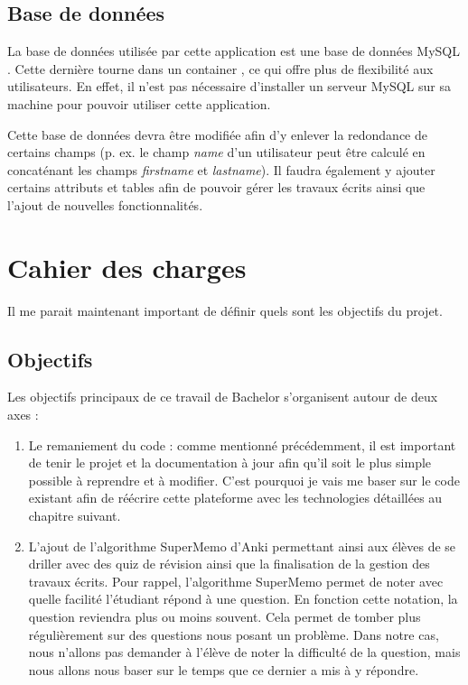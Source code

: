 \subsection{Base de données}
La base de données utilisée par cette application est une base de données MySQL \cite{MySQL}. Cette dernière tourne dans un container  \cite{Docker}, ce qui offre plus de flexibilité aux utilisateurs. En effet, il n'est pas nécessaire d'installer un serveur MySQL sur sa machine pour pouvoir utiliser cette application.

Cette base de données devra être modifiée afin d'y enlever la redondance de certains champs (p. ex. le champ \emph{name} d'un utilisateur peut être calculé en concaténant les champs \emph{firstname} et \emph{lastname}). Il faudra également y ajouter certains attributs et tables afin de pouvoir gérer les travaux écrits ainsi que l'ajout de nouvelles fonctionnalités.

\section{Cahier des charges}
Il me parait maintenant important de définir quels sont les objectifs du projet.

\subsection{Objectifs}
Les objectifs principaux de ce travail de Bachelor s'organisent autour de deux axes :

\begin{enumerate}
    \item Le remaniement du code : comme mentionné précédemment, il est important de tenir le projet et la documentation à jour afin qu'il soit le plus simple possible à reprendre et à modifier. C'est pourquoi je vais me baser sur le code existant afin de réécrire cette plateforme avec les technologies détaillées au chapitre suivant.
    \item L'ajout de l'algorithme SuperMemo d'Anki permettant ainsi aux élèves de se driller avec des quiz de révision ainsi que la finalisation de la gestion des travaux écrits. Pour rappel, l'algorithme SuperMemo permet de noter avec quelle facilité l'étudiant répond à une question. En fonction cette notation, la question reviendra plus ou moins souvent. Cela permet de tomber plus régulièrement sur des questions nous posant un problème. Dans notre cas, nous n'allons pas demander à l'élève de noter la difficulté de la question, mais nous allons nous baser sur le temps que ce dernier a mis à y répondre.
\end{enumerate}

